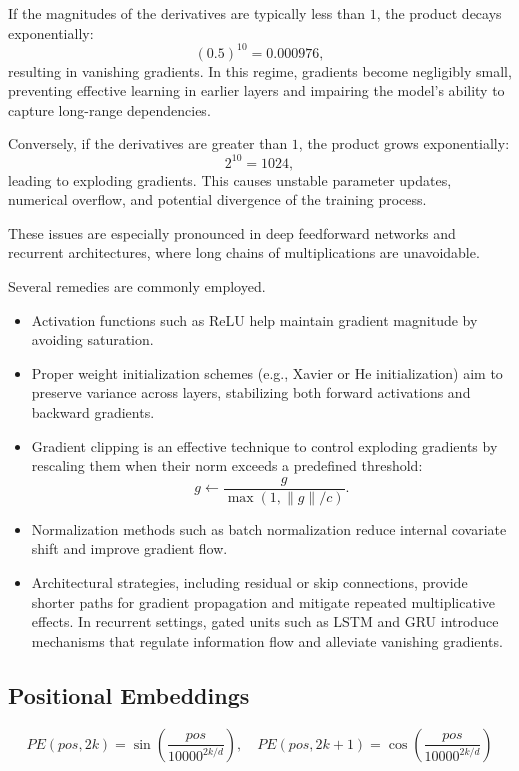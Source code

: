 \documentclass[10pt,a4paper]{article}
\begin{document}
If the magnitudes of the derivatives are typically less than $1$, the product decays exponentially:
\[
\left(0.5\right)^{10} = 0.000976,
\]
resulting in vanishing gradients. In this regime, gradients become negligibly small, preventing effective learning in earlier layers and impairing the model's ability to capture long-range dependencies.

Conversely, if the derivatives are greater than $1$, the product grows exponentially:
\[
2^{10} = 1024,
\]
leading to exploding gradients. This causes unstable parameter updates, numerical overflow, and potential divergence of the training process.

These issues are especially pronounced in deep feedforward networks and recurrent architectures, where long chains of multiplications are unavoidable.

Several remedies are commonly employed.
\begin{itemize}
    \item Activation functions such as ReLU help maintain gradient magnitude by avoiding saturation. 
    \item Proper weight initialization schemes (e.g., Xavier or He initialization) aim to preserve variance across layers, stabilizing both forward activations and backward gradients. 
    \item Gradient clipping is an effective technique to control exploding gradients by rescaling them when their norm exceeds a predefined threshold:
\[
g \leftarrow \frac{g}{\max(1, \|g\| / c)}.
\]
    \item Normalization methods such as batch normalization reduce internal covariate shift and improve gradient flow. 
    \item Architectural strategies, including residual or skip connections, provide shorter paths for gradient propagation and mitigate repeated multiplicative effects. In recurrent settings, gated units such as LSTM and GRU introduce mechanisms that regulate information flow and alleviate vanishing gradients.
\end{itemize}

\subsection{Positional Embeddings}
\[
PE(pos,2k)=\sin\left(\frac{pos}{10000^{2k/d}}\right), \quad
PE(pos,2k+1)=\cos\left(\frac{pos}{10000^{2k/d}}\right)
\]
\end{document}
